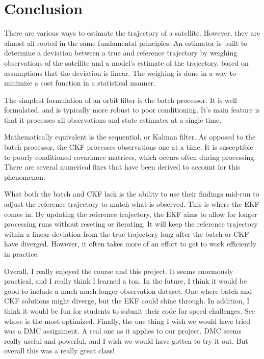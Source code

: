 \documentclass[12pt,a4paper,oneside]{article}
\numberwithin{equation}{section}   		%
\begin{document}
\section{Conclusion}
\label{sec:Conclusion}

There are various ways to estimate the trajectory of a satellite. However, they are almost all rooted in the same fundamental principles. An estimator is built to determine a deviation between a true and reference trajectory by weighing observations of the satellite and a model's estimate of the trajectory, based on assumptions that the deviation is linear. The weighing is done in a way to minimize a cost function in a statistical manner. 

The simplest formulation of an orbit filter is the batch processor. It is well formulated, and is typically more robust to poor conditioning. It's main feature is that it processes all observations and state estimates at a single time. 

Mathematically equivalent is the sequential, or Kalman filter. As opposed to the batch processor, the CKF processes observations one at a time. It is susceptible to poorly conditioned covariance matrices, which occurs often during processing. There are several numerical fixes that have been derived to account for this phenomenon. 

What both the batch and CKF lack is the ability to use their findings mid-run to adjust the reference trajectory to match what is observed. This is where the EKF comes in. By updating the reference trajectory, the EKF aims to allow for longer processing runs without reseting or iterating. It will keep the reference trajectory within a linear deviation from the true trajectory long after the batch or CKF have diverged. However, it often takes more of an effort to get to work efficiently in practice. 

Overall, I really enjoyed the course and this project. It seems enormously practical, and I really think I learned a ton. In the future, I think it would be good to include a much much longer observation dataset. One where batch and CKF solutions might diverge, but the EKF could shine through. In addition, I think it would be fun for students to submit their code for speed challenges. See whose is the most optimized. Finally, the one thing I wish we would have tried was a DMC assignment. A real one as it applies to our project.  DMC seems really useful and powerful, and I wish we would have gotten to try it out. But overall this was a really great class! 
\end{document}
